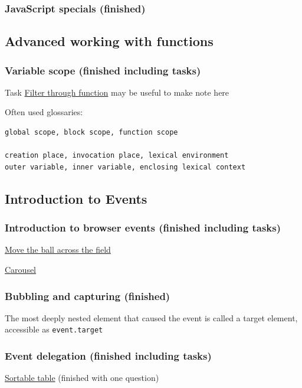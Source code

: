 \documentclass[a4paper, 12pt]{article}
\begin{document}
\subsubsection{JavaScript specials (finished)}

\subsection{Advanced working with functions}
\subsubsection{Variable scope (finished including tasks)}
Task \href{https://javascript.info/closure#filter-through-function}{Filter through function} may be useful to make note here

\noindent Often used glossaries:
\begin{verbatim}
global scope, block scope, function scope

creation place, invocation place, lexical environment
outer variable, inner variable, enclosing lexical context
\end{verbatim}

\subsection{Introduction to Events}
\subsubsection{Introduction to browser events (finished including tasks)}

\href{https://javascript.info/introduction-browser-events#move-the-ball-across-the-field}{Move the ball across the field}

\href{https://javascript.info/introduction-browser-events#carousel}{Carousel}

\subsubsection{Bubbling and capturing (finished)}
The most deeply nested element that caused the event is called a target element, accessible as \verb|event.target|

\subsubsection{Event delegation (finished including tasks)}

\href{https://javascript.info/event-delegation#sortable-table}{Sortable table} (finished with one question)
\end{document}
